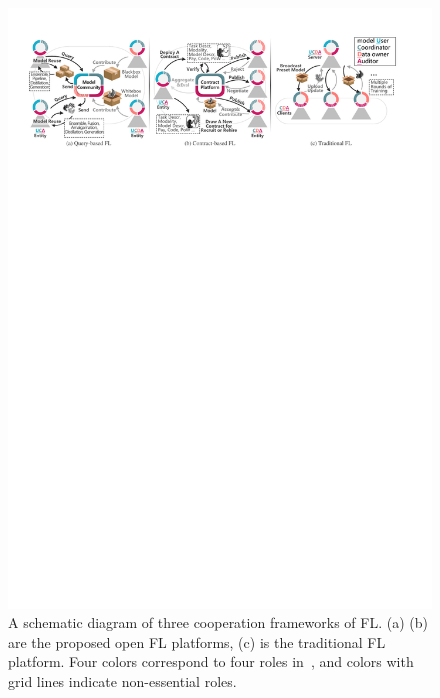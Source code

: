 \begin{figure}[b]
    \centering
    \includegraphics[width=\linewidth]{fig/coop_frame.pdf}
    \caption{A schematic diagram of three cooperation frameworks of FL. (a) (b) are the proposed open FL platforms, (c) is the traditional FL platform. Four colors correspond to four roles in~\cite{IEEEstd3652}, and colors with grid lines indicate non-essential roles.}
    \Description{}
    \label{fig:coop}
\end{figure}

